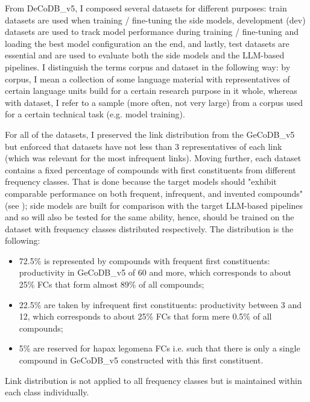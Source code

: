 \documentclass[11pt]{article}
\begin{document}
From DeCoDB\_v5, I composed several datasets for different purposes: train datasets are used when training / fine-tuning the side models, development (dev) datasets are used to track model performance during training / fine-tuning and loading the best model configuration an the end, and lastly, test datasets are essential and are used to evaluate both the side models and the LLM-based pipelines. I distinguish the terms corpus and dataset in the following way: by corpus, I mean a collection of some language material with representatives of certain language units build for a certain research purpose in it whole, whereas with dataset, I refer to a sample (more often, not very large) from a corpus used for a certain technical task (e.g. model training).

For all of the datasets, I preserved the link distribution from the GeCoDB\_v5 but enforced that datasets have not less than 3 representatives of each link (which was relevant for the most infrequent links). Moving further, each dataset contains a fixed percentage of compounds with first constituents from different frequency classes. That is done because the target models should "exhibit comparable performance on both frequent, infrequent, and invented compounds" (see ); side models are built for comparison with the target LLM-based pipelines and so will also be tested for the same ability, hence, should be trained on the dataset with frequency classes distributed respectively. The distribution is the following:

\begin{itemize}
    
    \item 72.5\% is represented by compounds with frequent first constituents: productivity in GeCoDB\_v5 of 60 and more, which corresponds to about 25\% FCs that form almost 89\% of all compounds;

    \item 22.5\% are taken by infrequent first constituents: productivity between 3 and 12, which corresponds to about 25\% FCs that form mere 0.5\% of all compounds;

    \item 5\% are reserved for hapax legomena FCs i.e. such that there is only a single compound in GeCoDB\_v5 constructed with this first constituent.
    
\end{itemize}

Link distribution is not applied to all frequency classes but is maintained within each class individually.
\end{document}
